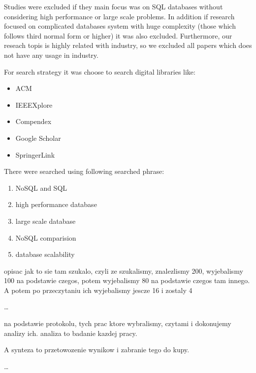 \documentclass[times, 10pt,twocolumn]{article}
\begin{document}
Studies were excluded if they main focus was on SQL databases without considering high performance or large scale problems. In addition if research focused on complicated databases system
with huge complexity (those which follows third normal form or higher) it was also excluded. Furthermore, our reseach topis is highly related with industry, so we excluded all papers 
which does not have any usage in industry.



For search strategy it was choose to search digital libraries like:
\begin{itemize}
	\item ACM
	\item IEEEXplore
	\item Compendex
	\item Google Scholar
	\item SpringerLink
\end{itemize}

There were searched using following searched phrase:
\begin{enumerate}
	\item NoSQL and SQL
	\item high performance database
	\item large scale database
	\item NoSQL comparision
	\item database scalability
\end{enumerate}



opisac jak to sie tam szukalo, czyli ze szukalismy, znalezlismy 200,
wyjebalismy 100 na podstawie czegos, potem wyjebalismy 80 na podstawie 
czegos tam innego. A potem po przeczytaniu ich wyjebalismy jescze 16 i zostaly
4

\ldots



na podstawie protokolu, tych prac ktore wybralismy, czytami i dokonujemy analizy ich.
analiza to badanie kazdej pracy.


A synteza to przetowozenie wynikow i zabranie tego do kupy.

\ldots
\end{document}
